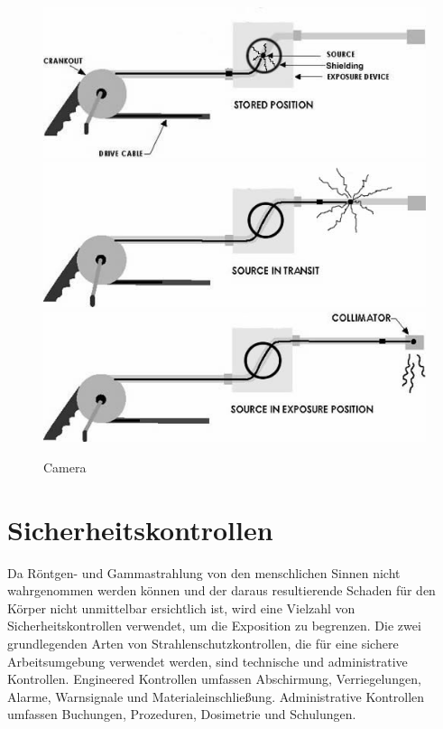 \begin{figure}[htb]
\centering
  \includegraphics[scale=0.4]{img/Gamma1.jpg}
  \includegraphics[scale=0.4]{img/Gamma2.jpg}
  \includegraphics[scale=0.4]{img/Gamma3.jpg}
  \caption{Camera}
  \label{fig:Camera}
\end{figure}
\section{Sicherheitskontrollen}
\label{kontrollen}
Da Röntgen- und Gammastrahlung von den menschlichen Sinnen nicht wahrgenommen werden können und der daraus resultierende Schaden für den Körper nicht unmittelbar ersichtlich ist, wird eine Vielzahl von Sicherheitskontrollen verwendet, um die Exposition zu begrenzen. Die zwei grundlegenden Arten von Strahlenschutzkontrollen, die für eine sichere Arbeitsumgebung verwendet werden, sind technische und administrative Kontrollen. Engineered Kontrollen umfassen Abschirmung, Verriegelungen, Alarme, Warnsignale und Materialeinschließung. Administrative Kontrollen umfassen Buchungen, Prozeduren, Dosimetrie und Schulungen.
